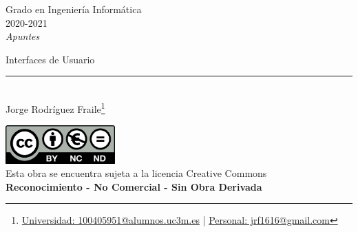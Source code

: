 \documentclass[12pt, twoside, openright]{report} %
\begin{document}
	
\begin{titlepage}
	\begin{sffamily}
	\color{azulUC3M}
	\begin{center}
		\begin{figure}[H] %
		\end{figure}
		\vspace{2.5cm}
		\begin{Large}
			Grado en Ingeniería Informática\\			
			2020-2021\\
			\vspace{2cm}		
			\textsl{Apuntes}\\
			\bigskip
		\end{Large}
		 	{\Huge Interfaces de Usuario}\\
		 	\vspace*{0.5cm}
	 		\rule{10.5cm}{0.1mm}\\
			\vspace*{0.9cm}
			{\LARGE Jorge Rodríguez Fraile\footnote{\href{mailto:100405951@alumnos.uc3m.es}{Universidad: 100405951@alumnos.uc3m.es}  |  \href{mailto:jrf1616@gmail.com}{Personal: jrf1616@gmail.com}}}\\ 
			\vspace*{1cm}
	\end{center}
	\vfill
	\color{black}
		\includegraphics[width=4.2cm]{img/creativecommons.png}\\
		Esta obra se encuentra sujeta a la licencia Creative Commons\\ \textbf{Reconocimiento - No Comercial - Sin Obra Derivada}
	\end{sffamily}
\end{titlepage}


\tableofcontents
\thispagestyle{fancy}
\end{document}
